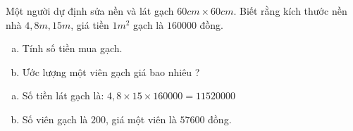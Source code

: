 \begin{ex}%
Một người dự định sửa nền và lát gạch $60 cm \times 60 cm$. Biết rằng kích thước nền nhà $4,8 m, 15m$, giá tiền $1m^2$ gạch là $160 000$ đồng.
\begin{enumerate}[a)]
\item Tính số tiền mua gạch.
\item Ước lượng một viên gạch giá bao nhiêu ?
\end{enumerate}
\loigiai
	{
	\begin{enumerate}[a)]
	\item Số tiền lát gạch là: $4,8 \times 15 \times 160000 = 11520000$
	\item Số viên gạch là $200$, giá một viên là $57600$ đồng.
	\end{enumerate}
	}
\end{ex}
